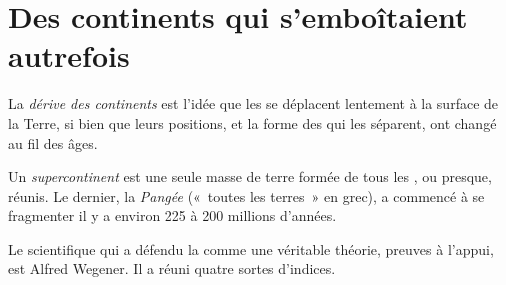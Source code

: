 \section{Des continents qui s'emboîtaient autrefois}

\begin{definition}\label{def:g7:plate-tectonics:continental-drift}
La \emph{dérive des continents}
est l'idée que les  se déplacent lentement à la surface de la
Terre, si bien que leurs positions, et la forme des  qui les
séparent, ont changé au fil des âges.
\end{definition}

\begin{definition}[Supercontinent]\label{def:g7:plate-tectonics:supercontinent}
Un \emph{supercontinent} est une seule masse de terre
formée de tous les , ou presque, réunis. Le dernier, la
\emph{Pangée} («~toutes les terres~» en grec), a
commencé à se fragmenter il y a environ 225 à 200 millions d'années.
\end{definition}

Le scientifique qui a défendu la  comme une véritable
théorie, preuves à l'appui, est Alfred Wegener. Il a réuni quatre sortes
d'indices.


